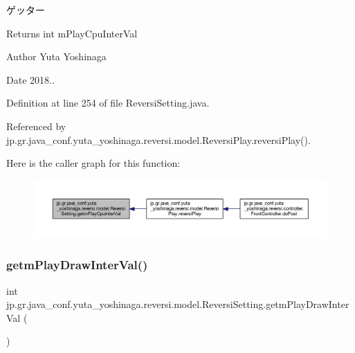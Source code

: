 ゲッター 

\begin{DoxyReturn}{Returns}
int m\+Play\+Cpu\+Inter\+Val 
\end{DoxyReturn}
\begin{DoxyAuthor}{Author}
Yuta Yoshinaga 
\end{DoxyAuthor}
\begin{DoxyDate}{Date}
2018.. 
\end{DoxyDate}


Definition at line 254 of file Reversi\+Setting.\+java.



Referenced by jp.\+gr.\+java\+\_\+conf.\+yuta\+\_\+yoshinaga.\+reversi.\+model.\+Reversi\+Play.\+reversi\+Play().

Here is the caller graph for this function\+:
\nopagebreak
\begin{figure}[H]
\begin{center}
\leavevmode
\includegraphics[width=350pt]{classjp_1_1gr_1_1java__conf_1_1yuta__yoshinaga_1_1reversi_1_1model_1_1_reversi_setting_acb1d20bc2dde58ec73e17bbe960cd218_icgraph}
\end{center}
\end{figure}
\mbox{\label{classjp_1_1gr_1_1java__conf_1_1yuta__yoshinaga_1_1reversi_1_1model_1_1_reversi_setting_a1269bfcbdc192e1f1429407d40cc6e67}} 
\subsubsection{\texorpdfstring{getm\+Play\+Draw\+Inter\+Val()}{getmPlayDrawInterVal()}}
{\footnotesize\ttfamily int jp.\+gr.\+java\+\_\+conf.\+yuta\+\_\+yoshinaga.\+reversi.\+model.\+Reversi\+Setting.\+getm\+Play\+Draw\+Inter\+Val (\begin{DoxyParamCaption}{ }\end{DoxyParamCaption})}



